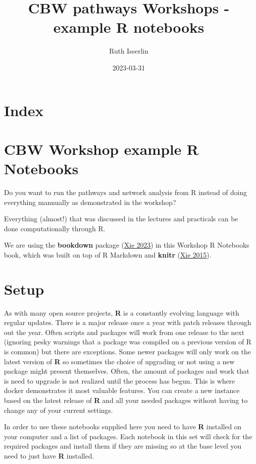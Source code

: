 \documentclass[
]{book}
\title{CBW pathways Workshops - example R notebooks}
\author{Ruth Isserlin}
\date{2023-03-31}
\begin{document}
\maketitle

{
\setcounter{tocdepth}{1}
\tableofcontents
}
\hypertarget{index}{%
\chapter{Index}\label{index}}

\hypertarget{intro}{%
\chapter{CBW Workshop example R Notebooks}\label{intro}}

Do you want to run the pathways and network analysis from R instead of doing everything mannually as demonstrated in the workshop?

Everything (almost!) that was discussed in the lectures and practicals can be done computationally through R.

We are using the \textbf{bookdown} package (\protect\hyperlink{ref-R-bookdown}{Xie 2023}) in this Workshop R Notebooks book, which was built on top of R Markdown and \textbf{knitr} (\protect\hyperlink{ref-xie2015}{Xie 2015}).

\hypertarget{setup}{%
\chapter{Setup}\label{setup}}

As with many open source projects, \textbf{R} is a constantly evolving language with regular updates. There is a major release once a year with patch releases through out the year. Often scripts and packages will work from one release to the next (ignoring pesky warnings that a package was compiled on a previous version of R is common) but there are exceptions. Some newer packages will only work on the latest version of \textbf{R} so sometimes the choice of upgrading or not using a new package might present themselves. Often, the amount of packages and work that is need to upgrade is not realized until the process has begun. This is where docker demonstrates it most valuable features. You can create a new instance based on the latest release of \textbf{R} and all your needed packages without having to change any of your current settings.

In order to use these notebooks supplied here you need to have \textbf{R} installed on your computer and a list of packages. Each notebook in this set will check for the required packages and install them if they are missing so at the base level you need to just have \textbf{R} installed.
\end{document}

